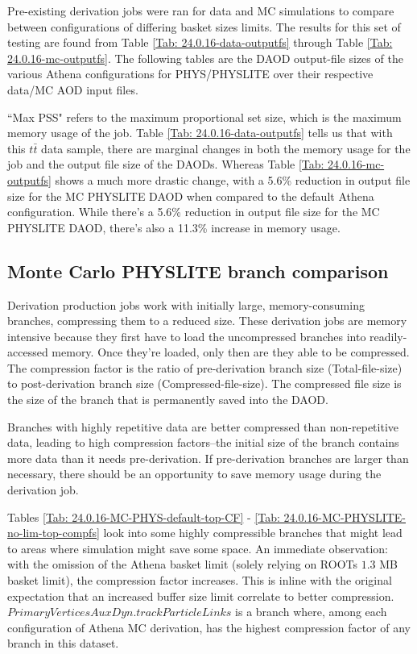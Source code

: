 Pre-existing derivation jobs were ran for data and MC simulations to compare between configurations of differing basket sizes limits. 
The results for this set of testing are found from Table \ref{Tab: 24.0.16-data-outputfs} through Table \ref{Tab: 24.0.16-mc-outputfs}. 
The following tables are the DAOD output-file sizes of the various Athena configurations for PHYS/PHYSLITE over their respective data/MC AOD input files. 





``Max PSS" refers to the maximum proportional set size, which is the maximum memory usage of the job.
Table \ref{Tab: 24.0.16-data-outputfs} tells us that with this $t\bar{t}$ data sample, there are marginal changes in both the memory usage for the job and the output file size of the DAODs. 
Whereas Table \ref{Tab: 24.0.16-mc-outputfs} shows a much more drastic change, with a 5.6\% reduction in output file size for the MC PHYSLITE DAOD when compared to the default Athena configuration.
While there's a 5.6\% reduction in output file size for the MC PHYSLITE DAOD, there's also a 11.3\% increase in memory usage. 


\subsection{Monte Carlo PHYSLITE branch comparison}
\label{sec:DAODProd_Results_Monte}

Derivation production jobs work with initially large, memory-consuming branches, compressing them to a reduced size. 
These derivation jobs are memory intensive because they first have to load the uncompressed branches into readily-accessed memory. 
Once they're loaded, only then are they able to be compressed. 
The compression factor is the ratio of pre-derivation branch size (Total-file-size) to post-derivation branch size (Compressed-file-size). 
The compressed file size is the size of the branch that is permanently saved into the DAOD.  

Branches with highly repetitive data are better compressed than non-repetitive data, leading to high compression factors--the initial size of the branch contains more data than it needs pre-derivation. 
If pre-derivation branches are larger than necessary, there should be an opportunity to save memory usage during the derivation job. 

Tables \ref{Tab: 24.0.16-MC-PHYS-default-top-CF} - \ref{Tab: 24.0.16-MC-PHYSLITE-no-lim-top-compfs} look into some highly compressible branches that might lead to areas where simulation might save some space. 
An immediate observation: with the omission of the Athena basket limit (solely relying on ROOTs $1.3$ MB basket limit), the compression factor increases. 
This is inline with the original expectation that an increased buffer size limit correlate to better compression. 
$\textit{PrimaryVerticesAuxDyn.trackParticleLinks}$ is a branch where, among each configuration of Athena MC derivation, has the highest compression factor of any branch in this dataset. 

